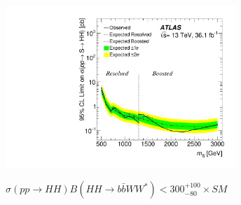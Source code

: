\documentclass{beamer}
\newcommand*{\header}[1]{\fontsize{16}{8}\selectfont \textbf{{\color{MyPurple}{#1}}}}
\begin{document}
\begin{frame}
\begin{center}
\header{Combined Resonant Production Limit}
\end{center}
\begin{center}
\includegraphics[width=0.65\textwidth]{figures/limit_2016_reOpt_HiggsApproved_Scalar_Paper_Combined_20190312_01}
\end{center}
\small
\vspace{-0.5cm}$\sigma(pp\rightarrow{}HH)B(HH\rightarrow{}b\bar{b}WW^*) < 300^{+100}_{-80} \times{} SM$
\end{frame}
\end{document}
